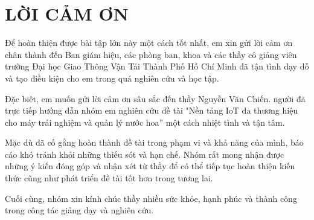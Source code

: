 \chapter*{LỜI CẢM ƠN}

Để hoàn thiện được bài tập lớn này một cách tốt nhất, em xin gửi lời cảm ơn chân thành đến Ban giám hiệu, các phòng ban, khoa và các thầy cô giảng viên trường Đại học Giao Thông Vận Tải Thành Phố Hồ Chí Minh đã tận tình dạy dỗ và tạo điều kiện cho em trong quá nghiên cứu và học tập. 

Đặc biêt, em muốn gửi lời cảm ơn sâu sắc đến thầy Nguyễn Văn Chiến. người đã trực tiếp hướng dẫn nhóm em nghiên cứu đề tài "Nền tảng IoT đa thương hiệu cho máy trải nghiệm và quản lý nước hoa” một cách nhiệt tình và tận tâm.

Mặc dù đã cố gắng hoàn thành đề tài trong phạm vi và khả năng của mình, báo cáo khó tránh khỏi những thiếu sót và hạn chế. Nhóm rất mong nhận được những ý kiến đóng góp và nhận xét từ thầy để có thể tiếp tục hoàn thiện kiến thức cũng như phát triển đề tài tốt hơn trong tương lai.

Cuối cùng, nhóm xin kính chúc thầy nhiều sức khỏe, hạnh phúc và thành công trong công tác giảng dạy và nghiên cứu.

